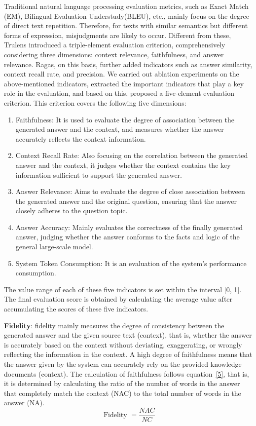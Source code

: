 Traditional natural language processing evaluation metrics, such as Exact Match (EM), Bilingual Evaluation Understudy(BLEU), etc., mainly focus on the degree of direct text repetition. Therefore, for texts with similar semantics but different forms of expression, misjudgments are likely to occur. Different from these, Trulens introduced a triple-element evaluation criterion, comprehensively considering three dimensions: context relevance, faithfulness, and answer relevance. Ragas, on this basis, further added indicators such as answer similarity, context recall rate, and precision.
We carried out ablation experiments on the above-mentioned indicators, extracted the important indicators that play a key role in the evaluation, and based on this, proposed a five-element evaluation criterion. This criterion covers the following five dimensions:
\begin{enumerate}
    \item Faithfulness: It is used to evaluate the degree of association between the generated answer and the context, and measures whether the answer accurately reflects the context information.
    \item Context Recall Rate: Also focusing on the correlation between the generated answer and the context, it judges whether the context contains the key information sufficient to support the generated answer.
    \item Answer Relevance: Aims to evaluate the degree of close association between the generated answer and the original question, ensuring that the answer closely adheres to the question topic.
    \item Answer Accuracy: Mainly evaluates the correctness of the finally generated answer, judging whether the answer conforms to the facts and logic of the general large-scale model.
    \item System Token Consumption: It is an evaluation of the system's performance consumption.
\end{enumerate}
The value range of each of these five indicators is set within the interval [0, 1]. The final evaluation score is obtained by calculating the average value after accumulating the scores of these five indicators.

\textbf{Fidelity}: fidelity mainly measures the degree of consistency between the generated answer and the given source text (context), that is, whether the answer is accurately based on the context without deviating, exaggerating, or wrongly reflecting the information in the context. A high degree of faithfulness means that the answer given by the system can accurately rely on the provided knowledge documents (context). The calculation of faithfulness follows equation~\ref{5}, that is, it is determined by calculating the ratio of the number of words in the answer that completely match the context (NAC) to the total number of words in the answer (NA).
\begin{equation}
\text { Fidelity }=\frac{NAC}{NC}
\label{5}
\end{equation}

